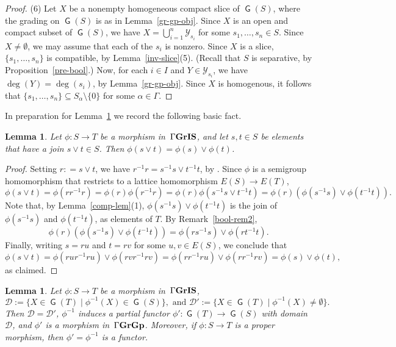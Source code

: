 \documentclass[a4paper,reqno,12pt]{amsart}
\numberwithin{equation}{section}
\theoremstyle{plain}
\newtheorem{lemma}[thm]{Lemma}
\theoremstyle{definition}
\newcommand{\GIS}{\operatorname{\Gamma\bf{GrIS}}}
\newcommand{\GG}{\operatorname{\Gamma\bf{GrGp}}}
\newcommand{\GP}{\operatorname{\mathsf{G}}}
\begin{document}
\begin{proof}
\smallskip

(6) Let $X$ be a nonempty homogeneous compact slice of $\GP(S)$, where the grading on $\GP(S)$ is as in Lemma~\ref{gr-gp-obj}. Since $X$ is an open and compact subset of $\GP(S)$, we have $X = \bigcup_{i=1}^n \mathcal{Y}_{s_i}$ for some $s_1, \dots, s_n \in S$. Since $X \neq \emptyset$, we may assume that each of the $s_i$ is nonzero. Since $X$ is a slice, $\{s_1, \dots, s_n\}$ is compatible, by Lemma~\ref{inv-slice}(5). (Recall that $S$ is separative, by Proposition~\ref{pre-bool}.) Now, for each $i \in I$ and $Y \in \mathcal{Y}_{s_i}$, we have $\deg(Y)=\deg(s_i)$, by Lemma~\ref{gr-gp-obj}. Since $X$ is homogenous, it follows that $\{s_1, \dots, s_n\} \subseteq S_{\alpha} \setminus \{0\}$ for some $\alpha \in \Gamma$.
\end{proof}

In preparation for Lemma~\ref{gr-gp-morph} we record the following basic fact.

\begin{lemma} \label{joins-rem}
Let $\phi : S \to T$ be a morphism in $\, \GIS$, and let $s,t \in S$ be elements that have a join $s \lor t \in S$. Then $\phi(s \lor t) = \phi(s) \lor \phi(t)$.
\end{lemma}

\begin{proof}
Setting $r: = s \lor t$, we have $r^{-1}r = s^{-1}s \lor t^{-1}t$, by \cite[Lemma 2.4.4(1)]{Lawson1}. Since $\phi$ is a semigroup homomorphism that restricts to a lattice homomorphism $E(S) \to E(T)$,
\[\phi(s \lor t) = \phi(rr^{-1}r) = \phi(r)\phi(r^{-1}r) = \phi(r)\phi(s^{-1}s \lor t^{-1}t) = \phi(r)(\phi(s^{-1}s) \lor \phi(t^{-1}t)).\]
Note that, by Lemma~\ref{comp-lem}(1), $\phi(s^{-1}s) \lor \phi(t^{-1}t)$ is the join of $\phi(s^{-1}s)$ and $\phi(t^{-1}t)$, as elements of $T$. By Remark~\ref{bool-rem2},
\[\phi(r)(\phi(s^{-1}s) \lor \phi(t^{-1}t)) = \phi(rs^{-1}s) \lor \phi(rt^{-1}t).\]
Finally, writing $s = ru$ and $t = rv$ for some $u,v \in E(S)$, we conclude that
\[\phi(s \lor t) = \phi(rur^{-1}ru) \lor \phi(rvr^{-1}rv) = \phi(rr^{-1}ru) \lor \phi(rr^{-1}rv) = \phi(s) \lor \phi(t),\]
as claimed.
\end{proof}

\begin{lemma} \label{gr-gp-morph}
Let $\phi : S \to T$ be a morphism in $\, \GIS$,
\[\mathcal{D} := \big\{X \in \GP(T) \mid \phi^{-1}(X) \in \GP(S)\big\}, \text{ and } \mathcal{D}' := \big\{X \in \GP(T) \mid \phi^{-1}(X) \neq \emptyset\big\}.\] 
Then $\mathcal{D} = \mathcal{D}'$, $\phi^{-1}$ induces a partial functor $\phi': \GP(T) \to \GP(S)$ with domain $\mathcal{D}$, and $\phi'$ is a morphism in $\, \GG$. Moreover, if $\phi : S \to T$ is a proper morphism, then $\phi' = \phi^{-1}$ is a functor.
\end{lemma}
\end{document}

